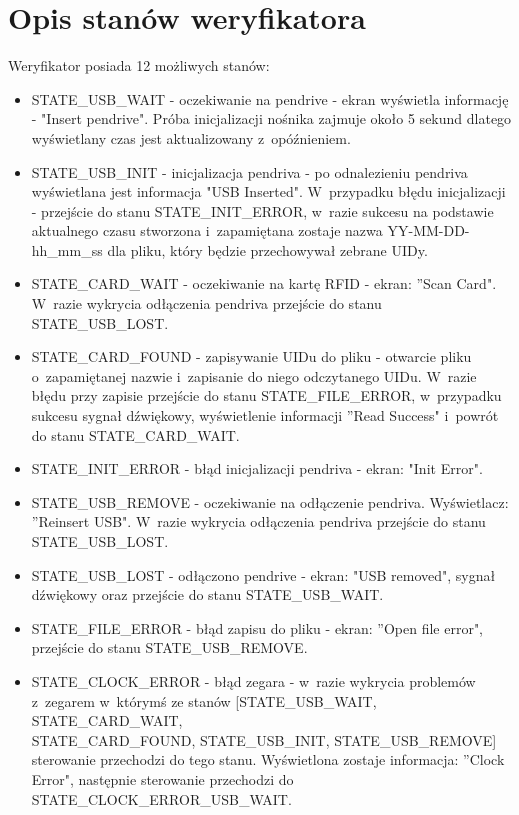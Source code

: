 \documentclass[declaration,shortabstract, mgr]{iithesis}
\begin{document}
\section{Opis stanów weryfikatora}\label{a:stany}
Weryfikator posiada 12 możliwych stanów:
\begin{itemize}
\item STATE\_USB\_WAIT - oczekiwanie na pendrive - ekran wyświetla informację - "Insert pendrive". Próba inicjalizacji nośnika zajmuje około 5 sekund dlatego wyświetlany czas jest aktualizowany z~opóźnieniem.
\item STATE\_USB\_INIT - inicjalizacja pendriva - po odnalezieniu pendriva wyświetlana jest informacja "USB Inserted". W~przypadku błędu inicjalizacji - przejście do stanu STATE\_INIT\_ERROR, w~razie sukcesu na podstawie aktualnego czasu stworzona i~zapamiętana zostaje nazwa YY-MM-DD-hh\_mm\_ss dla pliku, który będzie przechowywał zebrane UIDy.
\item STATE\_CARD\_WAIT - oczekiwanie na kartę RFID - ekran: ''Scan Card". W~razie wykrycia odłączenia pendriva przejście do stanu STATE\_USB\_LOST.
\item STATE\_CARD\_FOUND - zapisywanie UIDu do pliku - otwarcie pliku o~zapamiętanej nazwie i~zapisanie do niego odczytanego UIDu. W~razie błędu przy zapisie przejście do stanu STATE\_FILE\_ERROR, w~przypadku sukcesu sygnał dźwiękowy, wyświetlenie informacji ''Read Success" i~powrót do stanu STATE\_CARD\_WAIT.
\item STATE\_INIT\_ERROR - błąd inicjalizacji pendriva - ekran: "Init Error".
\item STATE\_USB\_REMOVE - oczekiwanie na odłączenie pendriva. Wyświetlacz:\\''Reinsert USB". W~razie wykrycia odłączenia pendriva przejście do stanu STATE\_USB\_LOST.
\item STATE\_USB\_LOST - odłączono pendrive - ekran: "USB removed", sygnał dźwiękowy oraz przejście do stanu STATE\_USB\_WAIT.
\item STATE\_FILE\_ERROR - błąd zapisu do pliku - ekran: ''Open file error", przejście do stanu STATE\_USB\_REMOVE.
\item STATE\_CLOCK\_ERROR - błąd zegara - w~razie wykrycia problemów z~zegarem w~którymś ze stanów [STATE\_USB\_WAIT, STATE\_CARD\_WAIT, \\STATE\_CARD\_FOUND, STATE\_USB\_INIT, STATE\_USB\_REMOVE] sterowanie przechodzi do tego stanu. Wyświetlona zostaje informacja: ''Clock Error", następnie sterowanie przechodzi do STATE\_CLOCK\_ERROR\_USB\_WAIT.

\end{itemize}
\end{document}
